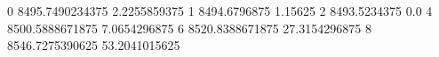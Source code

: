 0 8495.7490234375 2.2255859375
1 8494.6796875 1.15625
2 8493.5234375 0.0
4 8500.5888671875 7.0654296875
6 8520.8388671875 27.3154296875
8 8546.7275390625 53.2041015625
